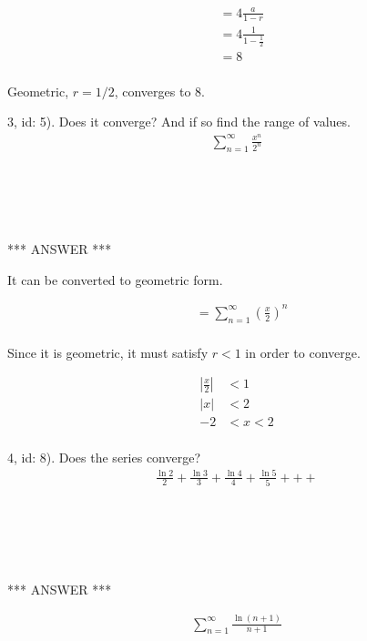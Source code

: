 \documentclass[fleqn]{article}
\begin{document}
\begin{align*}
&= 4 \frac{a}{1 - r}\\
&= 4 \frac{1}{1 - \frac{1}{2}}\\
&= 8\\
\end{align*}

Geometric, $r = 1/2$, converges to $8$.

3, id: 5).  Does it converge?  And if so find the range of values.\\

\begin{align*}
\sum_{n=1}^{\infty} \frac{x^n}{2^n}
\end{align*}


\begin{verbatim}





\end{verbatim}

*** ANSWER ***


It can be converted to geometric form.

\begin{align*}
&= \sum_{n=1}^{\infty} \left(\frac{x}{2}\right)^n\\
\end{align*}

Since it is geometric, it must satisfy $r < 1$ in order to converge.

\begin{align*}
\left| \frac{x}{2} \right| &< 1\\
\left| x \right| &< 2\\
-2 & < x < 2\\
\end{align*}


4, id: 8).  Does the series converge?\\

\begin{align*}
\frac{\ln2}{2} + \frac{\ln3}{3} + \frac{\ln4}{4} + \frac{\ln5}{5} + + +\\
\end{align*}

\begin{verbatim}





\end{verbatim}

*** ANSWER ***

\begin{align*}
\sum_{n=1}^{\infty} \frac{\ln(n+1)}{n+1}\\
\end{align*}
\end{document}
